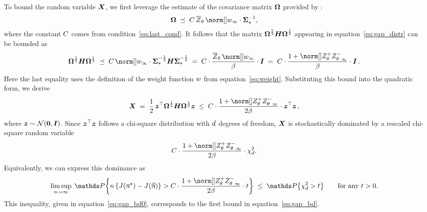 	To bound the random variable $ \boldsymbol{X} $, we first leverage the estimate of the covariance matrix $ \boldsymbol{\Omega} $ provided by :
	\begin{align*}
		\CovOmega \; \preceq \; \Const{} \, \Partitionthetabar \, \supnorm{\weight} \cdot \CovOpstar^{-1},
	\end{align*}
    where the constant $C$ comes from condition~\eqref{eq:last_cond}.
	It follows that the matrix $ \boldsymbol{\Omega}^{\frac{1}{2}} \boldsymbol{H} \boldsymbol{\Omega}^{\frac{1}{2}} $ appearing in equation~\eqref{eq:gap_distr} can be bounded as
	\begin{align*}
		\CovOmega^{\frac{1}{2}} \HessMt \CovOmega^{\frac{1}{2}} 
		\; \preceq \;  \Const \, \supnorm{\weight} \cdot \CovOpstar^{-\frac{1}{2}} \HessMt \CovOpstar^{-\frac{1}{2}} \; = \; \Const \cdot \frac{\Partitionthetabar \, \supnorm{\weight}}{\parabeta} \cdot \IdMt
		\; = \; \Const \cdot \frac{1 + \supnorm{\Partitionthetapos \Partitionthetaneg}}{\parabeta}
		\cdot \IdMt \, .
	\end{align*}
	Here the last equality uses the definition of the weight function $ w $ from equation~\eqref{eq:weight}. Substituting this bound into the quadratic form, we derive
	\begin{align*}
		\bX
		\; = \; \frac{1}{2} \, \vecz^{\top} \CovOmega^{\frac{1}{2}} \HessMt \CovOmega^{\frac{1}{2}} \vecz 
		\; \leq \; \Const \cdot \frac{1 + \supnorm{\Partitionthetapos \Partitionthetaneg}}{2\parabeta}
		\cdot \vecz^{\top} \vecz \, ,
	\end{align*}
	where $ \boldsymbol{z} \sim \mathcal{N}(\boldsymbol{0}, \boldsymbol{I}) $.
	Since $ \boldsymbol{z}^{\top} \boldsymbol{z} $ follows a chi-square distribution with $ d $ degrees of freedom, $ \boldsymbol{X} $ is stochastically dominated by a rescaled chi-square random variable 
	\begin{align*}
		\Const \cdot \frac{1 + \supnorm{\Partitionthetapos \Partitionthetaneg}}{2\parabeta} \cdot \chisquare_{\Dim}.
	\end{align*}
	Equivalently, we can express this dominance as
	\begin{align}
		\label{eq:gap_bd0}
		\limsup_{\numobs \rightarrow \infty} \; \Prob \bigg\{ \numobs \, \{ \scalarvalue(\policystar) - \scalarvalue(\policyhat) \} > \Const \cdot \frac{1 + \supnorm{\Partitionthetapos \Partitionthetaneg}}{2\parabeta} \cdot t \bigg\}
		\; \leq \; \Prob\big\{ \chisquare_{\Dim} > t \big\}
		\qquad \mbox{for any $t > 0$}.
	\end{align}
	This inequality, given in equation~\eqref{eq:gap_bd0}, corresponds to the first bound in equation~\eqref{eq:gap_bd}.
	
